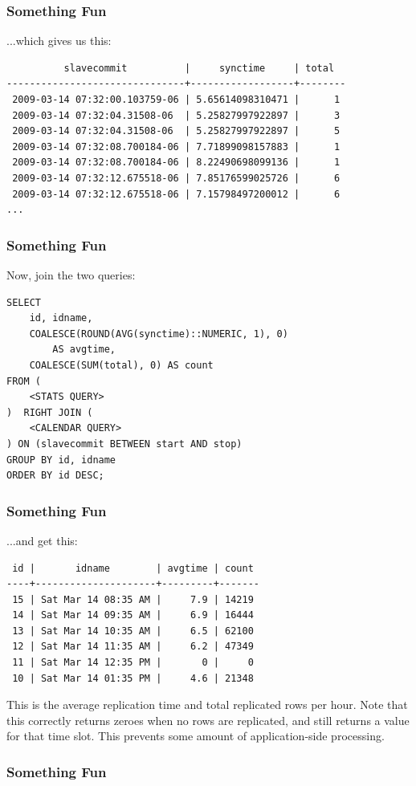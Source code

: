 \documentclass{beamer}
\begin{document}
\begin{frame}[fragile]
    \frametitle{Something Fun}
    ...which gives us this:
    \footnotesize
    \begin{verbatim}
          slavecommit          |     synctime     | total
-------------------------------+------------------+--------
 2009-03-14 07:32:00.103759-06 | 5.65614098310471 |      1
 2009-03-14 07:32:04.31508-06  | 5.25827997922897 |      3
 2009-03-14 07:32:04.31508-06  | 5.25827997922897 |      5
 2009-03-14 07:32:08.700184-06 | 7.71899098157883 |      1
 2009-03-14 07:32:08.700184-06 | 8.22490698099136 |      1
 2009-03-14 07:32:12.675518-06 | 7.85176599025726 |      6
 2009-03-14 07:32:12.675518-06 | 7.15798497200012 |      6
...
    \end{verbatim}
    \normalsize
\end{frame}

\begin{frame}[fragile]
    \frametitle{Something Fun}
    Now, join the two queries:
    \begin{verbatim}
SELECT
    id, idname,
    COALESCE(ROUND(AVG(synctime)::NUMERIC, 1), 0)
        AS avgtime,
    COALESCE(SUM(total), 0) AS count
FROM (
    <STATS QUERY>
)  RIGHT JOIN (
    <CALENDAR QUERY>
) ON (slavecommit BETWEEN start AND stop)
GROUP BY id, idname
ORDER BY id DESC;
    \end{verbatim}
\end{frame}

\begin{frame}[fragile]
    \frametitle{Something Fun}
    ...and get this:
    \begin{verbatim}
 id |       idname        | avgtime | count
----+---------------------+---------+-------
 15 | Sat Mar 14 08:35 AM |     7.9 | 14219
 14 | Sat Mar 14 09:35 AM |     6.9 | 16444
 13 | Sat Mar 14 10:35 AM |     6.5 | 62100
 12 | Sat Mar 14 11:35 AM |     6.2 | 47349
 11 | Sat Mar 14 12:35 PM |       0 |     0
 10 | Sat Mar 14 01:35 PM |     4.6 | 21348
    \end{verbatim}
    This is the average replication time and total replicated rows per hour.
    Note that this correctly returns zeroes when no rows are replicated, and
    still returns a value for that time slot. This prevents some amount of
    application-side processing.
\end{frame}

\begin{frame}
    \frametitle{Something Fun}
\end{frame}
\end{document}
